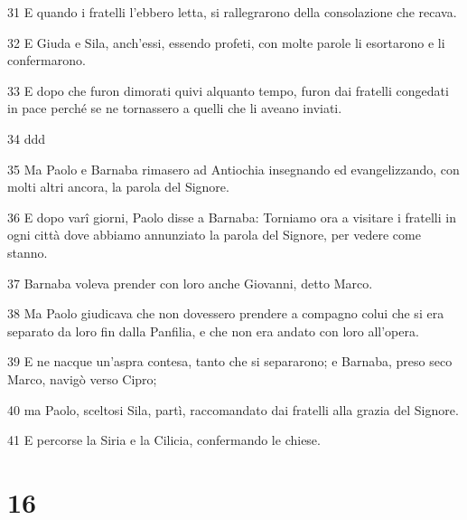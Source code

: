\par 31 E quando i fratelli l'ebbero letta, si rallegrarono della consolazione che recava.
\par 32 E Giuda e Sila, anch'essi, essendo profeti, con molte parole li esortarono e li confermarono.
\par 33 E dopo che furon dimorati quivi alquanto tempo, furon dai fratelli congedati in pace perché se ne tornassero a quelli che li aveano inviati.
\par 34 ddd
\par 35 Ma Paolo e Barnaba rimasero ad Antiochia insegnando ed evangelizzando, con molti altri ancora, la parola del Signore.
\par 36 E dopo varî giorni, Paolo disse a Barnaba: Torniamo ora a visitare i fratelli in ogni città dove abbiamo annunziato la parola del Signore, per vedere come stanno.
\par 37 Barnaba voleva prender con loro anche Giovanni, detto Marco.
\par 38 Ma Paolo giudicava che non dovessero prendere a compagno colui che si era separato da loro fin dalla Panfilia, e che non era andato con loro all'opera.
\par 39 E ne nacque un'aspra contesa, tanto che si separarono; e Barnaba, preso seco Marco, navigò verso Cipro;
\par 40 ma Paolo, sceltosi Sila, partì, raccomandato dai fratelli alla grazia del Signore.
\par 41 E percorse la Siria e la Cilicia, confermando le chiese.

\chapter{16}

